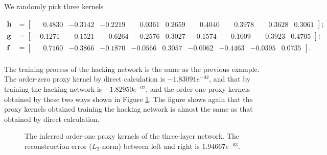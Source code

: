 \documentclass[twoside,11pt]{article}
\newcommand{\syncrecord}[2]{#2} %
\def\tvar#1{\mathbf{#1}} %
\begin{document}
We randomly pick three kernels
\begin{small}
  \syncrecord{oconv_l3_kernels}{
    \begin{equation*}
      \begin{aligned}
        \tvar{h} & = \begin{bmatrix}\phantom{-}0.4830&-0.3142&-0.2219&\phantom{-}0.0361&0.2659&\phantom{-}0.4040&\phantom{-}0.3978&\phantom{-}0.3628&0.3061\end{bmatrix}; \\
        \tvar{g} & = \begin{bmatrix}-0.1271&\phantom{-}0.1521&\phantom{-}0.6264&-0.2576&0.3027&-0.1574&\phantom{-}0.1009&\phantom{-}0.3923&0.4705\end{bmatrix}; \\
        \tvar{f} & = \begin{bmatrix}\phantom{-}0.7160&-0.3866&-0.1870&-0.0566&0.3057&-0.0062&-0.4463&-0.0395&0.0735\end{bmatrix}. \\
      \end{aligned}
    \end{equation*}
  }
\end{small}

The training process of the hacking network is the same as the previous example.
The order-zero proxy kernel by direct calculation is \syncrecord{oconv_l3_computed_w0}{\(-1.83091e^{-02}\)}, and that by training the hacking network is \syncrecord{oconv_l3_estimated_w0}{\(-1.82950e^{-02}\)}, and the order-one proxy kernels obtained by these two ways shown in Figure \ref{fig:oconv-conv-approximate-three-layer-net-w1-g2}.
The figure shows again that the proxy kernels obtained training the hacking network is almost the same as that obtained by direct calculation.

\begin{figure}[htbp]
  \centering
  \caption{The inferred order-one proxy kernels of the three-layer network. The reconstruction error (\(L_2\)-norm) between left and right is \syncrecord{oconv_l3_err_w1}{\(1.94667e^{-03}\)}.}
  \label{fig:oconv-conv-approximate-three-layer-net-w1-g2}
\end{figure}
\end{document}
